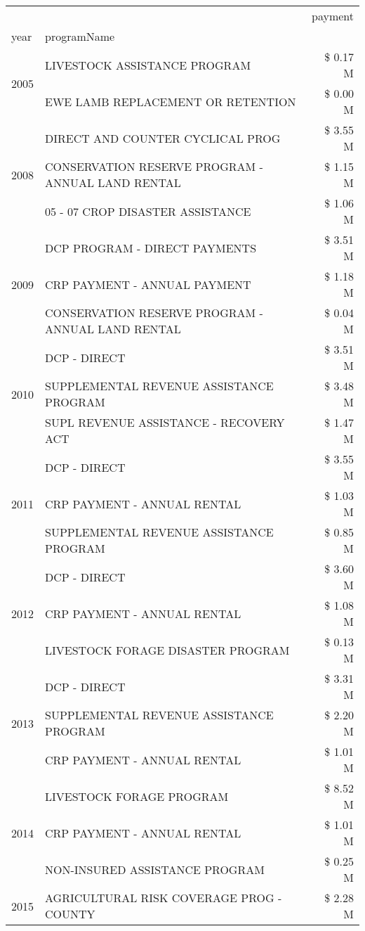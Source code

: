 \begin{tabular}{llr}
\toprule
 &  & payment \\
year & programName &  \\
\midrule
\multirow[t]{2}{*}{2005} & LIVESTOCK ASSISTANCE PROGRAM & \$ 0.17 M \\
 & EWE LAMB REPLACEMENT OR RETENTION & \$ 0.00 M \\
\cline{1-3}
\multirow[t]{3}{*}{2008} & DIRECT AND COUNTER CYCLICAL PROG & \$ 3.55 M \\
 & CONSERVATION RESERVE PROGRAM - ANNUAL LAND RENTAL & \$ 1.15 M \\
 & 05 - 07 CROP DISASTER ASSISTANCE & \$ 1.06 M \\
\cline{1-3}
\multirow[t]{3}{*}{2009} & DCP PROGRAM - DIRECT PAYMENTS & \$ 3.51 M \\
 & CRP PAYMENT - ANNUAL PAYMENT & \$ 1.18 M \\
 & CONSERVATION RESERVE PROGRAM - ANNUAL LAND RENTAL & \$ 0.04 M \\
\cline{1-3}
\multirow[t]{3}{*}{2010} & DCP - DIRECT & \$ 3.51 M \\
 & SUPPLEMENTAL REVENUE ASSISTANCE PROGRAM & \$ 3.48 M \\
 & SUPL REVENUE ASSISTANCE - RECOVERY ACT & \$ 1.47 M \\
\cline{1-3}
\multirow[t]{3}{*}{2011} & DCP - DIRECT & \$ 3.55 M \\
 & CRP PAYMENT - ANNUAL RENTAL & \$ 1.03 M \\
 & SUPPLEMENTAL REVENUE ASSISTANCE PROGRAM & \$ 0.85 M \\
\cline{1-3}
\multirow[t]{3}{*}{2012} & DCP - DIRECT & \$ 3.60 M \\
 & CRP PAYMENT - ANNUAL RENTAL & \$ 1.08 M \\
 & LIVESTOCK FORAGE DISASTER PROGRAM & \$ 0.13 M \\
\cline{1-3}
\multirow[t]{3}{*}{2013} & DCP - DIRECT & \$ 3.31 M \\
 & SUPPLEMENTAL REVENUE ASSISTANCE PROGRAM & \$ 2.20 M \\
 & CRP PAYMENT - ANNUAL RENTAL & \$ 1.01 M \\
\cline{1-3}
\multirow[t]{3}{*}{2014} & LIVESTOCK FORAGE PROGRAM & \$ 8.52 M \\
 & CRP PAYMENT - ANNUAL RENTAL & \$ 1.01 M \\
 & NON-INSURED ASSISTANCE PROGRAM & \$ 0.25 M \\
\cline{1-3}
\multirow[t]{3}{*}{2015} & AGRICULTURAL RISK COVERAGE PROG - COUNTY & \$ 2.28 M \\

\end{tabular}
